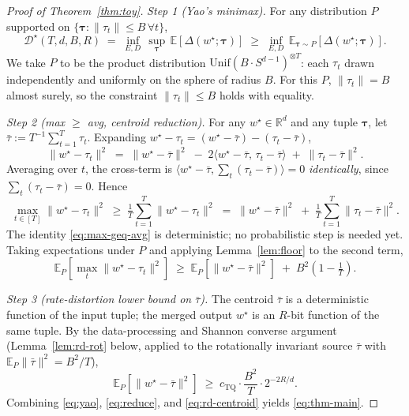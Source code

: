 \documentclass{article}
\theoremstyle{remark}
\newcommand{\R}{\mathbb{R}}
\newcommand{\E}{\mathbb{E}}
\begin{document}
\begin{proof}[Proof of Theorem~\ref{thm:toy}]
\emph{Step 1 (Yao's minimax).}
For any distribution $P$ supported on $\{\boldsymbol\tau : \|\tau_t\|
\leq B\,\forall t\}$,
\begin{equation}\label{eq:yao}
  \mathcal{D}^\star(T,d,B,R)
  \;=\; \inf_{E,D}\, \sup_{\boldsymbol\tau}\,
  \E\!\left[\Delta(w^\star; \boldsymbol\tau)\right]
  \;\geq\;
  \inf_{E,D}\, \E_{\boldsymbol\tau \sim P}\!
  \left[\Delta(w^\star; \boldsymbol\tau)\right].
\end{equation}
We take $P$ to be the product distribution $\mathrm{Unif}(B\cdot
S^{d-1})^{\otimes T}$: each $\tau_t$ drawn independently and
uniformly on the sphere of radius $B$. For this $P$, $\|\tau_t\| = B$
almost surely, so the constraint $\|\tau_t\| \leq B$ holds with
equality.

\smallskip\noindent\emph{Step 2 (max $\geq$ avg, centroid reduction).}
For any $w^\star \in \R^d$ and any tuple $\boldsymbol\tau$, let
$\bar\tau := T^{-1}\sum_{t=1}^T \tau_t$. Expanding
$w^\star - \tau_t = (w^\star - \bar\tau) - (\tau_t - \bar\tau)$,
\[
  \|w^\star - \tau_t\|^2
  \;=\; \|w^\star - \bar\tau\|^2
    \;-\; 2\langle w^\star - \bar\tau,\, \tau_t - \bar\tau\rangle
    \;+\; \|\tau_t - \bar\tau\|^2.
\]
Averaging over $t$, the cross-term is
$\langle w^\star - \bar\tau, \sum_t (\tau_t - \bar\tau)\rangle = 0$
\emph{identically}, since $\sum_t(\tau_t - \bar\tau) = 0$. Hence
\begin{equation}\label{eq:max-geq-avg}
  \max_{t\in[T]} \|w^\star - \tau_t\|^2
  \;\geq\; \tfrac{1}{T}\sum_{t=1}^T \|w^\star - \tau_t\|^2
  \;=\; \|w^\star - \bar\tau\|^2 \;+\;
  \tfrac{1}{T}\sum_{t=1}^T \|\tau_t - \bar\tau\|^2.
\end{equation}
The identity \eqref{eq:max-geq-avg} is deterministic; no probabilistic
step is needed yet. Taking expectations under $P$ and applying
Lemma~\ref{lem:floor} to the second term,
\begin{equation}\label{eq:reduce}
  \E_P\!\left[\max_t \|w^\star - \tau_t\|^2\right]
  \;\geq\; \E_P\!\left[\|w^\star - \bar\tau\|^2\right]
  \;+\; B^2\!\left(1 - \tfrac{1}{T}\right).
\end{equation}

\smallskip\noindent\emph{Step 3 (rate-distortion lower bound on $\bar\tau$).}
The centroid $\bar\tau$ is a deterministic function of the input tuple;
the merged output $w^\star$ is an $R$-bit function of the same
tuple. By the data-processing and Shannon converse argument
(Lemma~\ref{lem:rd-rot} below, applied to the rotationally invariant
source $\bar\tau$ with $\E_P\|\bar\tau\|^2 = B^2/T$),
\begin{equation}\label{eq:rd-centroid}
  \E_P\!\left[\|w^\star - \bar\tau\|^2\right]
  \;\geq\; c_{\mathrm{TQ}} \cdot \frac{B^2}{T} \cdot 2^{-2R/d}.
\end{equation}
Combining \eqref{eq:yao}, \eqref{eq:reduce}, and \eqref{eq:rd-centroid}
yields \eqref{eq:thm-main}.
\end{proof}
\end{document}

